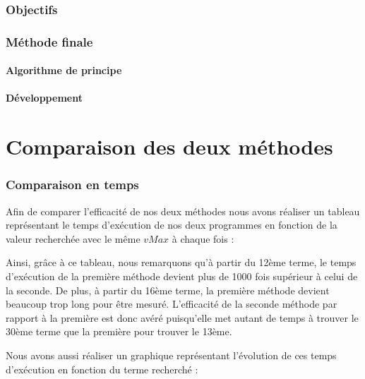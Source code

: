 \documentclass{article}
\begin{document}
\section {Objectifs}

\section{Méthode finale}

\subsection{Algorithme de principe}


\subsection{Développement}

\newpage
\part{Comparaison des deux méthodes}
\section{Comparaison en temps}
Afin de comparer l'efficacité de nos deux méthodes nous avons réaliser un tableau représentant le temps d'exécution de nos deux programmes en fonction de la valeur recherchée avec le même $vMax$ à chaque fois :

\bigbreak
\begin{center}
\end{center}
\bigbreak

Ainsi, grâce à ce tableau, nous remarquons qu'à partir du 12ème terme, le temps d'exécution de la première méthode devient plus de 1000 fois supérieur à celui de la seconde. De plus, à partir du 16ème terme, la première méthode devient beaucoup trop long pour être mesuré. L'efficacité de la seconde méthode par rapport à la première est donc avéré puisqu'elle met autant de temps à trouver le 30ème terme que la première pour trouver le 13ème.

Nous avons aussi réaliser un graphique représentant l'évolution de ces temps d'exécution en fonction du terme recherché :

\bigbreak
\begin{center}
\end{center}
\bigbreak
\end{document}
